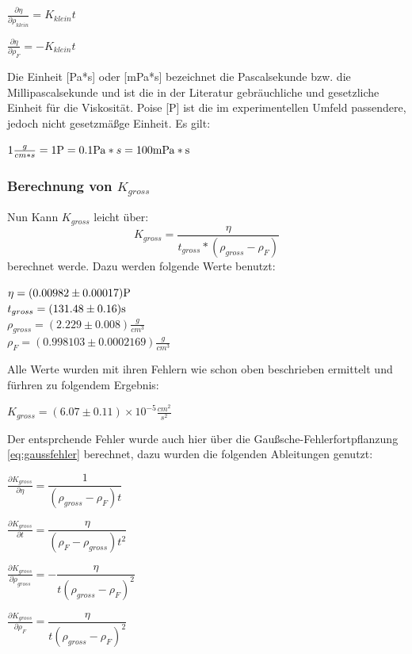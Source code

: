 \begin{center}
    $\frac{\partial \eta}{\partial \rho_{klein}}=K_{klein}t$
\end{center}
\begin{center}
    $\frac{\partial \eta}{\partial \rho_F}=-K_{klein}t$
\end{center}
Die Einheit [Pa*s] oder [mPa*s] bezeichnet die Pascalsekunde bzw. die Millipascalsekunde und ist die in der 
Literatur gebräuchliche und gesetzliche Einheit für die Viskosität. Poise [P] ist die im experimentellen Umfeld
passendere, jedoch nicht gesetzmäßge Einheit. Es gilt:
\begin{center}
    $1\frac{g}{cm*s}=1\si[]{P}=0.1\si[]{Pa}*s=100\si[]{mPa*s}$
\end{center} 
\subsubsection{Berechnung von $K_{gross}$}
\label{sec:kugelkonstante1}
Nun Kann $K_{gross}$ leicht über:
\begin{equation}
    \label{eq:Kgross}
    K_{gross}=\frac{\eta}{t_{gross}*(\rho_{gross}-\rho_F)}
\end{equation}
berechnet werde. Dazu werden folgende Werte benutzt:
\begin{center}
    $\eta=(0.00982\pm0.00017)\si[]{P}$\\
    $t_{gross}=(131.48\pm0.16)\si[]{s}$\\
    $\rho_{gross}=(2.229\pm0.008)\frac{g}{cm^3}$\\
    $\rho_{F}=(0.998103\pm0.0002169)\frac{g}{cm^3}$
\end{center}
Alle Werte wurden mit ihren Fehlern wie schon oben beschrieben ermittelt und fürhren zu folgendem Ergebnis:
\begin{center}
    $K_{gross}=(6.07\pm0.11)\times 10^{-5} \frac{cm^2}{s^2}$
\end{center}
Der entsprchende Fehler wurde auch hier über die Gaußsche-Fehlerfortpflanzung \autoref{eq:gaussfehler} berechnet,
dazu wurden die folgenden Ableitungen genutzt:
\begin{center}
    $\frac{\partial K_{gross}}{\partial \eta}=\dfrac{1}{\left(\rho_{gross}-\rho_F\right)t}$
\end{center}
\begin{center}
    $\frac{\partial K_{gross}}{\partial t}=\dfrac{\eta}{\left(\rho_F-\rho_{gross}\right)t^2}$
\end{center}
\begin{center}
    $\frac{\partial K_{gross}}{\partial \rho_{gross}}=-\dfrac{\eta}{t\left(\rho_{gross}-\rho_F\right)^2}$
\end{center}
\begin{center}
    $\frac{\partial K_{gross}}{\partial \rho_{F}}=\dfrac{\eta}{t\left(\rho_{gross}-\rho_F\right)^2}$
\end{center}

